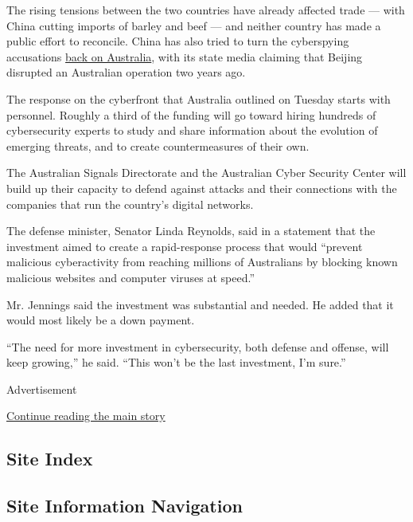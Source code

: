 The rising tensions between the two countries have already affected
trade --- with China cutting imports of barley and beef --- and neither
country has made a public effort to reconcile. China has also tried to
turn the cyberspying accusations
\href{https://www.abc.net.au/news/2020-06-29/chinese-state-media-says-australia-is-stepping-up-spy-activities/12402032?utm_source=sfmc\&utm_medium=email\&utm_content=\&utm_campaign=\%5bnews_sfmc_newsmail_pm_df_!n1\%5d\%3a8935\&user_id=fd273ea9ec95db56c7d3affcb610d4d0e8fcb4982c0e24bcb107bc2167382d75\&WT.tsrc=email\&WT.mc_id=Email\%7c\%5bnews_sfmc_newsmail_pm_df_!n1\%5d\%7c8935ABCNewsmail_topstories_articlelink}{back
on Australia}, with its state media claiming that Beijing disrupted an
Australian operation two years ago.

The response on the cyberfront that Australia outlined on Tuesday starts
with personnel. Roughly a third of the funding will go toward hiring
hundreds of cybersecurity experts to study and share information about
the evolution of emerging threats, and to create countermeasures of
their own.

The Australian Signals Directorate and the Australian Cyber Security
Center will build up their capacity to defend against attacks and their
connections with the companies that run the country's digital networks.

The defense minister, Senator Linda Reynolds, said in a statement that
the investment aimed to create a rapid-response process that would
``prevent malicious cyberactivity from reaching millions of Australians
by blocking known malicious websites and computer viruses at speed.''

Mr. Jennings said the investment was substantial and needed. He added
that it would most likely be a down payment.

``The need for more investment in cybersecurity, both defense and
offense, will keep growing,'' he said. ``This won't be the last
investment, I'm sure.''

Advertisement

\protect\hyperlink{after-bottom}{Continue reading the main story}

\hypertarget{site-index}{%
\subsection{Site Index}\label{site-index}}

\hypertarget{site-information-navigation}{%
\subsection{Site Information
Navigation}\label{site-information-navigation}}

